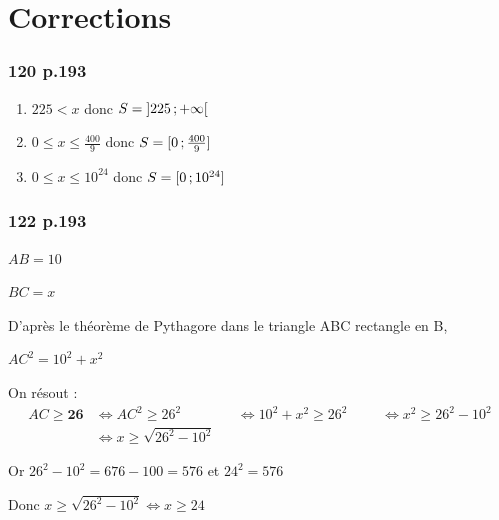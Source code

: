 \documentclass[10pt,a4paper,openany,twoside]{book}
\begin{document}
	\entetegal{}
    \section*{Corrections}


\subsubsection*{120 p.193}
\begin{enumerate}[label=$\alph*)$]
    \item $225<x$ donc $S = \mathopen{]}225\mathclose{}\mathpunct{};+\infty\mathclose{[}$
    \item $0\le x \le \frac{400}{9}$ donc $S = \mathopen{[}0\mathclose{}\mathpunct{};\frac{400}{9}\mathclose{]}$
    \item $0\le x \le 10^{24}$ donc $S = \mathopen{[}0\mathclose{}\mathpunct{};10^{24}\mathclose{]}$
\end{enumerate}

\subsubsection*{122 p.193}
$AB = 10$

$BC = x$

D'après le théorème de Pythagore dans le triangle ABC rectangle en B,

$AC^2 = 10^2 +x^2$

On résout :
\begin{align*}
    AC \ge \mathbf{26} &\iff AC^2 \ge 26^2 &&\iff 10^2+x^2 \ge 26^2 &&&\iff x^2\ge 26^2-10^2 \\
    &\iff x\ge \sqrt{26^2-10^2}
\end{align*}

Or $26^2-10^2 = 676 - 100 = 576$ et $24^2 = 576$

Donc $x\ge \sqrt{26^2-10^2} \iff x\ge 24$
\end{document}
